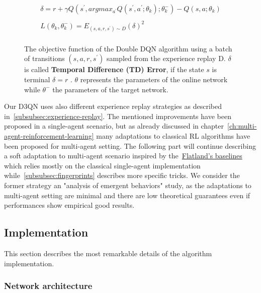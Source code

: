 \documentclass[11pt, a4paper, hidelinks]{report}
\begin{document}
\begin{figure}
	\begin{gather*}
		\delta = r + \gamma Q\left( s^{'}, argmax_{a^{'}}Q\left( s^{'}, a^{'}; \theta_{k} \right); \theta_{k}^{-} \right) - Q(s, a; \theta_{k})\\\\
	    L(\theta_{k}, \theta_{k}^{-}) = E_{\left(s, a, r, s^{'}\right) \sim D} \left( \delta \right)^{2}\\
	\end{gather*}

	\caption{The objective function of the Double DQN algorithm using a batch of transitions $(s, a, r, s^{'})$ sampled from the experience replay D. $\delta$ is called \textbf{Temporal Difference (TD) Error}, if the state $s$ is terminal $\delta = r$ . $\theta$ represents the parameters of the online network while $\theta^{-}$ the parameters of the target network.}\label{fig:d3qn_objective}
\end{figure}

Our D3QN uses also different experience replay strategies as described in~\ref{subsubsec:experience-replay}.
The mentioned improvements have been proposed in a single-agent scenario, but as already discussed in chapter~\ref{ch:multi-agent-reinforcement-learning} many adaptations to classical RL algorithms have been proposed for multi-agent setting.
The following part will continue describing a soft adaptation to multi-agent scenario inspired by the~\href{https://gitlab.aicrowd.com/flatland/flatland-examples}{Flatland's baselines} which relies mostly on the classical single-agent implementation while~\ref{subsubsec:fingerprints} describes more specific tricks.
We consider the former strategy an "analysis of emergent behaviors" study, as the adaptations to multi-agent setting are minimal and there are low theoretical guarantees even if performances show empirical good results.

\subsection{Implementation}\label{subsec:implementation2}

This section describes the most remarkable details of the algorithm implementation.

\subsubsection{Network architecture}
\end{document}
